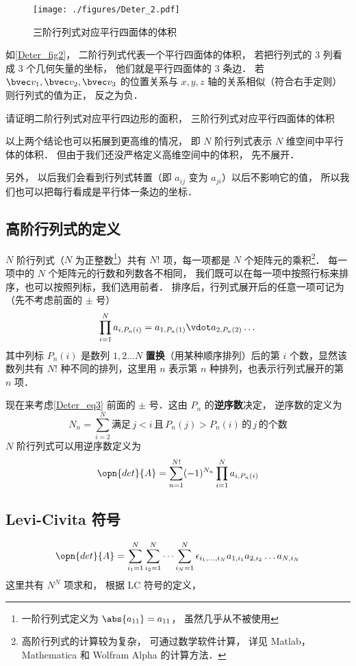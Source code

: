 \begin{figure}[ht]
\centering
\texttt{[image: ./figures/Deter\_2.pdf]}
\caption{三阶行列式对应平行四面体的体积} \label{Deter_fig2}
\end{figure}
如\autoref{Deter_fig2}， 二阶行列式代表一个平行四面体的体积， 若把行列式的 3 列看成 3 个几何矢量的坐标， 他们就是平行四面体的 3 条边． 若 $\bvec v_1, \bvec v_2, \bvec v_3$ 的位置关系与 $x, y, z$ 轴的关系相似（符合右手定则） 则行列式的值为正， 反之为负．

\begin{exercise}{}
请证明二阶行列式对应平行四边形的面积， 三阶行列式对应平行四面体的体积
\end{exercise}

以上两个结论也可以拓展到更高维的情况， 即 $N$ 阶行列式表示 $N$ 维空间中平行体的体积． 但由于我们还没严格定义高维空间中的体积， 先不展开． 

另外， 以后我们会看到行列式转置（即 $a_{ij}$ 变为 $a_{ji}$）以后不影响它的值， %
所以我们也可以把每行看成是平行体一条边的坐标．

\subsection{高阶行列式的定义}

$N$ 阶行列式（$N$ 为正整数\footnote{一阶行列式定义为 $\abs{a_{11}}=a_{11}$， 虽然几乎从不被使用}）共有 $N!$ 项，每一项都是 $N$ 个矩阵元的乘积\footnote{高阶行列式的计算较为复杂， 可通过数学软件计算， 详见 Matlab，Mathematica 和 Wolfram Alpha 的计算方法．%
}． 每一项中的 $N$ 个矩阵元的行数和列数各不相同， 我们既可以在每一项中按照行标来排序，也可以按照列标，我们选用前者． 排序后，行列式展开后的任意一项可记为（先不考虑前面的 $\pm$ 号）
\begin{equation}\label{Deter_eq3}
\prod_{i=1}^N a_{i,P_n(i)} = 
a_{1,P_n(1)} \vdot a_{2,P_n(2)} \dots
\end{equation}
其中列标 ${P_n}(i)$ 是数列 $1,2 \dots N$ \textbf{置换}（用某种顺序排列）后的第 $i$ 个数，显然该数列共有 $N!$ 种不同的排列，这里用 $n$ 表示第 $n$ 种排列，也表示行列式展开的第 $n$ 项．

现在来考虑\autoref{Deter_eq3} 前面的 $\pm$ 号．这由 $P_n$ 的\textbf{逆序数}决定， 逆序数的定义为
\begin{equation}\label{Deter_eq5}
N_n = \sum_{i=2}^N \text{满足}\, j<i \,\text{且}\, P_n(j) > P_n(i) \, \text{的}\, j\, \text{的个数} 
\end{equation}
$N$ 阶行列式可以用逆序数定义为
\begin{equation}\label{Deter_eq4}
\opn{det}{A} = \sum_{n=1}^{N!} (-1)^{N_n} \prod_{i=1}^N a_{i,P_n(i)}
\end{equation}

\subsection{Levi-Civita 符号}
\begin{equation}
\opn{det}{A} = \sum_{i_1 = 1}^N \sum_{i_2 = 1}^N \dots \sum_{i_N = 1}^N \epsilon_{i_1, \dots, i_N} a_{1,i_1}a_{2,i_2}\dots a_{N,i_N}
\end{equation}
这里共有 $N^N$ 项求和， 根据 LC 符号的定义， 
